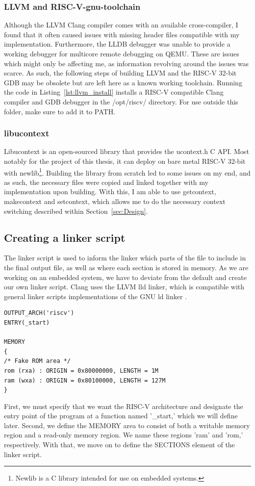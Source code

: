 \subsubsection*{LLVM and RISC-V-gnu-toolchain}
Although the LLVM Clang compiler comes with an available cross-compiler, I found
that it often caused issues with missing header files compatible with my
implementation. Furthermore, the LLDB debugger was unable to provide a working
debugger for multicore remote debugging on QEMU. These are issues which might
only be affecting me, as information revolving around the issues was scarce. As
such, the following steps of building LLVM and the RISC-V 32-bit GDB may be
obsolete but are left here as a known working toolchain. Running the code in
Listing~\ref{lst:llvm_install} installs a RISC-V compatible Clang compiler and
GDB debugger in the /opt/riscv/ directory. For use outside this folder, make
sure to add it to PATH.

\subsubsection*{libucontext}
Libucontext is an open-sourced library that provides the ucontext.h C API. Most
notably for the project of this thesis, it can deploy on bare metal RISC-V
32-bit with newlib\footnote{Newlib is a C library intended for use on embedded
systems.}. Building the library from scratch led to some issues on my end, and
as such, the necessary files were copied and linked together with my
implementation upon building. With this, I am able to use getcontext,
makecontext and setcontext, which allows me to do the necessary context
switching described within Section~\ref{sec:Design}.


\subsection{Creating a linker script}
The linker script is used to inform the linker which parts of the file to
include in the final output file, as well as where each section is stored in
memory. As we are working on an embedded system, we have to deviate from the
default and create our own linker script. Clang uses the LLVM lld linker,
which is compatible with general linker scripts implementations of the GNU ld
linker \cite{llvm-org-linker}.

\begin{lstlisting}[caption=Memory area defined in linker script]
OUTPUT_ARCH('riscv')
ENTRY(_start)

MEMORY
{
/* Fake ROM area */
rom (rxa) : ORIGIN = 0x80000000, LENGTH = 1M
ram (wxa) : ORIGIN = 0x80100000, LENGTH = 127M
}
\end{lstlisting}
First, we must specify that we want the RISC-V architecture and designate the
entry point of the program at a function named '\_start,' which we will define
later. Second, we define the MEMORY area to consist of both a writable memory
region and a read-only memory region. We name these regions 'ram' and 'rom,'
respectively. With that, we move on to define the SECTIONS element of the linker
script.

